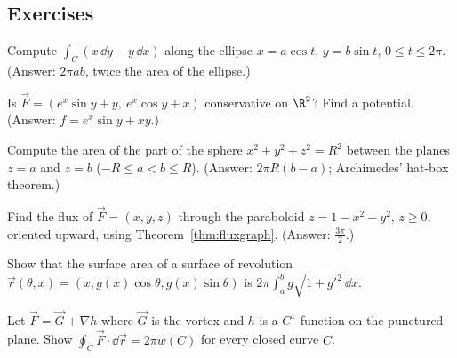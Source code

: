 \subsection*{Exercises}
\begin{exercise}
Compute $\int_C(x\,\dd y-y\,\dd x)$ along the ellipse $x=a\cos t$, $y=b\sin t$, $0\le t\le2\pi$. (Answer: $2\pi ab$, twice the area of the ellipse.)
\end{exercise}
\begin{exercise}
Is $\vec F=(e^x\sin y+y,\ e^x\cos y+x)$ conservative on $\R^2$? Find a potential. (Answer: $f=e^x\sin y+xy$.)
\end{exercise}
\begin{exercise}
Compute the area of the part of the sphere $x^2+y^2+z^2=R^2$ between the planes $z=a$ and $z=b$ ($-R\le a<b\le R$). (Answer: $2\pi R(b-a)$; Archimedes' hat-box theorem.)
\end{exercise}
\begin{exercise}
Find the flux of $\vec F=(x,y,z)$ through the paraboloid $z=1-x^2-y^2$, $z\ge0$, oriented upward, using Theorem~\ref{thm:fluxgraph}. (Answer: $\frac{3\pi}2$.)
\end{exercise}
\begin{exercise}
Show that the surface area of a surface of revolution $\vec r(\theta,x)=(x,g(x)\cos\theta,g(x)\sin\theta)$ is $2\pi\int_a^bg\sqrt{1+g'^2}\,\dd x$.
\end{exercise}
\begin{exercise}
Let $\vec F=\vec G+\nabla h$ where $\vec G$ is the vortex and $h$ is a $C^1$ function on the punctured plane. Show $\oint_C\vec F\cdot\dd\vec r=2\pi w(C)$ for every closed curve $C$.
\end{exercise}
